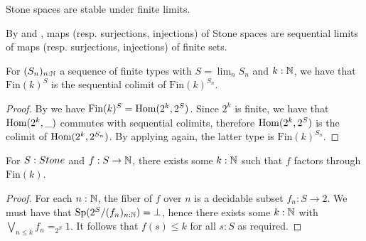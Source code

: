 \begin{corollary}
Stone spaces are stable under finite limits.
\end{corollary}
\begin{remark}\label{StoneClosedUnderPullback}\label{ProFiniteMapsFactorization}
  By  and 
  , maps (resp. surjections, injections) of Stone spaces
  are sequential limits of maps (resp. surjections, injections) of finite sets. 
%
%
%
%
\end{remark}

\begin{lemma}\label{ScottFiniteCodomain}
  For $(S_n)_{n:\mathbb{N}}$ a sequence of finite types with $S=\lim_nS_n$ and $k:\mathbb{N}$, we have that $\mathrm{Fin}(k)^{S}$ is the sequential colimit of $\mathrm{Fin}(k)^{S_n}$.
\end{lemma}
\begin{proof}
  By  we have $\mathrm{Fin}(k)^S = \mathrm{Hom}(2^{k},2^S)$.
  Since $2^{k}$ is finite, we have that $\mathrm{Hom}(2^k,\_)$ commutes with sequential colimits, therefore $\mathrm{Hom}(2^{k},2^S)$ is the colimit of $\mathrm{Hom}(2^{k},2^{S_n})$. 
  By applying  again, %
  the latter type is $\mathrm{Fin}(k)^{S_n}$.%
\end{proof}

\begin{lemma}\label{MapsStoneToNareBounded}
  For $S:\Stone$ and $f:S \to \mathbb{N}$, there exists some $k:\mathbb{N}$ such that $f$ factors through $\mathrm{Fin}(k)$. 
\end{lemma}
\begin{proof}
  For each $n:\mathbb{N}$, the fiber of $f$ over $n$ is a decidable subset $f_n:S \to 2$. 
  We must have that $\operatorname{Sp}(2^S/(f_n)_{n:\mathbb{N}}) = \bot$, hence there exists some $k:\mathbb{N}$ with 
  $\bigvee_{n\leq k} f_n =_{2^S} 1 $. 
  It follows that $f(s)\leq k$ for all $s:S$ as required. 
\end{proof}

